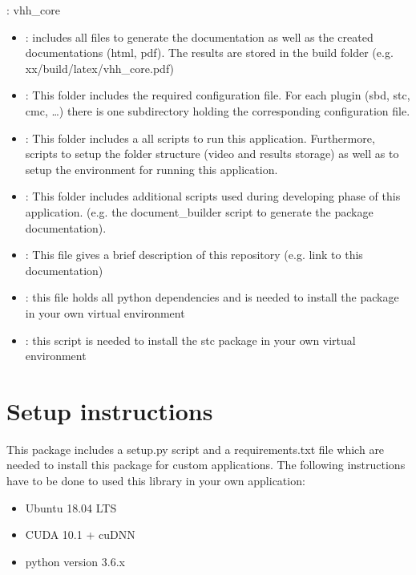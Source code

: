 \documentclass[letterpaper,10pt,english,openany,oneside]{sphinxmanual}
\begin{document}
: vhh\_core
\begin{itemize}
\item {} 
: includes all files to generate the documentation as well as the created documentations (html, pdf). The results are stored in the build folder (e.g. xx/build/latex/vhh\_core.pdf)

\item {} 
: This folder includes the required configuration file. For each plugin (sbd, stc, cmc, …) there is one subdirectory holding the corresponding configuration file.

\item {} 
: This folder includes a all scripts to run this application. Furthermore, scripts to setup the folder structure (video and results storage) as well as to setup the environment for running this application.

\item {} 
: This folder includes additional scripts used during developing phase of this application. (e.g. the document\_builder script to generate the package documentation).

\item {} 
: This file gives a brief description of this repository (e.g. link to this documentation)

\item {} 
: this file holds all python dependencies and is needed to install the package in your own virtual environment

\item {} 
: this script is needed to install the stc package in your own virtual environment

\end{itemize}


\chapter{Setup  instructions}
\label{\detokenize{index:setup-instructions}}
This package includes a setup.py script and a requirements.txt file which are needed to install this package for custom applications.
The following instructions have to be done to used this library in your own application:

\begin{itemize}
\item {} 
Ubuntu 18.04 LTS

\item {} 
CUDA 10.1 + cuDNN

\item {} 
python version 3.6.x

\end{itemize}
\end{document}
